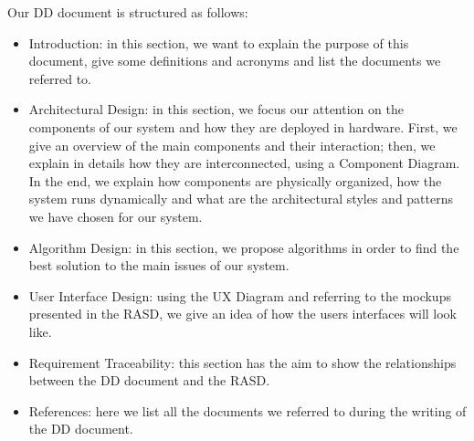 Our DD document is structured as follows:
\begin{itemize}
    \item Introduction: in this section, we want to explain the purpose of this document, give some definitions and acronyms and list the documents we referred to. 
    \item Architectural Design: in this section, we focus our attention on the components of our system and how they are deployed in hardware. First, we give an overview of the main components and their interaction; then, we explain in details how they are interconnected, using a Component Diagram.
    In the end, we explain how components are physically organized, how the system runs dynamically and what are the architectural styles and patterns we have chosen for our system.
    \item Algorithm Design: in this section, we propose algorithms in order to find the best solution to the main issues of our system.
    \item User Interface Design: using the UX Diagram and referring to the mockups presented in the RASD, we give an idea of how the users interfaces will look like.
    \item Requirement Traceability: this section has the aim to show the relationships between the DD document and the RASD.
    \item References: here we list all the documents we referred to during the writing of the DD document.
\end{itemize}